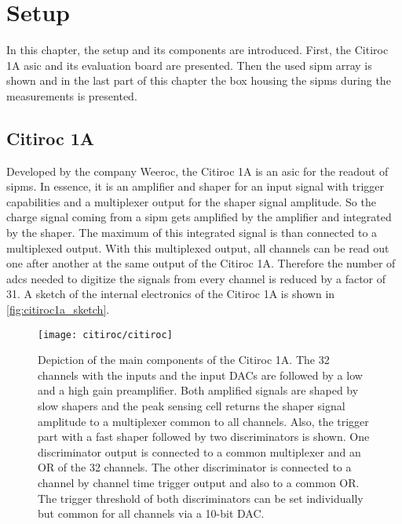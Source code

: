 \chapter{Setup}
In this chapter, the setup and its components are introduced. 
First, the Citiroc 1A \ac{asic} and its evaluation board are presented. 
Then the used \ac{sipm} array is shown and in the last part of this chapter the box housing the \ac{sipm}s during the measurements is presented.



\section{Citiroc 1A}
Developed by the company Weeroc, the Citiroc 1A is an \ac{asic} for the readout of \ac{sipm}s. 
In essence, it is an amplifier and shaper for an input signal with trigger capabilities and a multiplexer output for the shaper signal amplitude.
So the charge signal coming from a \ac{sipm} gets amplified by the amplifier and integrated by the shaper.
The maximum of this integrated signal is than connected to a multiplexed output.
With this multiplexed output, all channels can be read out one after another at the same output of the Citiroc 1A.
Therefore the number of \acp{adc} needed to digitize the signals from every channel is reduced by a factor of 31.
A sketch of the internal electronics of the Citiroc 1A is shown in \autoref{fig:citiroc1a_sketch}.

\begin{figure}
    \centering
    \texttt{[image: citiroc/citiroc]}
    \caption[Citiroc 1A sketch]{Depiction of the main components of the Citiroc 1A. 
	The 32 channels with the inputs and the input DACs are followed by a low and a high gain preamplifier. 
	Both amplified signals are shaped by slow shapers and the peak sensing cell returns the shaper signal amplitude to a multiplexer common to all channels. 
	Also, the trigger part with a fast shaper followed by two discriminators is shown. 
	One discriminator output is connected to a common multiplexer and an OR of the 32 channels. 
	The other discriminator is connected to a channel by channel time trigger output and also to a common OR. 
	The trigger threshold of both discriminators can be set individually but common for all channels via a 10-bit DAC. \cite{citiroc}}
    \label{fig:citiroc1a_sketch}
\end{figure}

